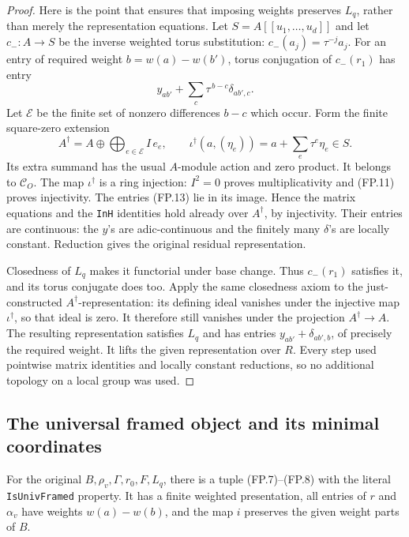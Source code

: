 \begin{proof}
Here is the point that ensures that imposing weights preserves
$L_q$, rather than merely the representation equations.
Let $S=A[[u_1,\ldots,u_d]]$ and let
$c_-:A\to S$ be the inverse weighted torus substitution:
$c_-(a_j)=\tau^{-j}a_j$.
For an entry of required weight $b=w(a)-w(b')$, torus conjugation
of $c_-(r_1)$ has entry
\[
                 y_{ab'}+\sum_c\tau^{\,b-c}\delta_{ab',c}.
 \tag{FP.13}
\]
Let $\mathcal E$ be the finite set of nonzero differences $b-c$
which occur.  Form the finite square-zero extension
\[
 A^\dagger=A\oplus\bigoplus_{e\in\mathcal E}I\,e_e,\qquad
 \iota^\dagger(a,(\eta_e))=a+\sum_e\tau^e\eta_e\in S.
 \tag{FP.14}
\]
Its extra summand has the usual $A$-module action and zero product.
It belongs to $\mathcal C_O$.
The map $\iota^\dagger$ is a ring injection: $I^2=0$ proves
multiplicativity and (FP.11) proves injectivity.
The entries (FP.13) lie in its image.  Hence the matrix equations
and the \texttt{InH} identities hold already over $A^\dagger$,
by injectivity.  Their entries are continuous: the $y$'s are
adic-continuous and the finitely many $\delta$'s are locally
constant.  Reduction gives the original residual representation.

Closedness of $L_q$ makes it functorial under base change.
Thus $c_-(r_1)$ satisfies it, and its torus conjugate does too.
Apply the same closedness axiom to the just-constructed
$A^\dagger$-representation: its defining ideal vanishes under the
injective map $\iota^\dagger$, so that ideal is zero.
It therefore still vanishes under the projection $A^\dagger\to A$.
The resulting representation satisfies $L_q$ and has entries
$y_{ab'}+\delta_{ab',b}$, of precisely the required weight.
It lifts the given representation over $R$.
Every step used pointwise matrix identities and locally constant
reductions, so no additional topology on a local group was used.
\end{proof}

\subsection{The universal framed object and its minimal coordinates}

\begin{proposition}
\label{claim:FP5}
For the original $B,\rho_v,\Gamma,r_0,F,L_q$, there is a tuple
(FP.7)--(FP.8) with the literal \texttt{IsUnivFramed} property.
It has a finite weighted presentation, all entries of $r$ and
$\alpha_v$ have weights $w(a)-w(b)$, and the map $i$ preserves
the given weight parts of $B$.
\end{proposition}

